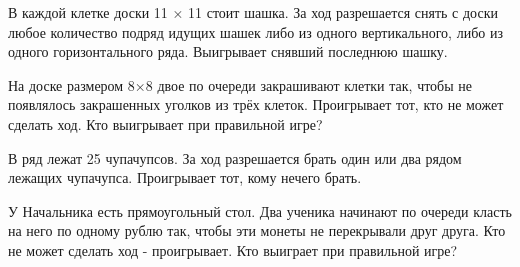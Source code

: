 В каждой клетке доски 11 × 11 стоит шашка. За ход разрешается снять с доски любое количество подряд идущих шашек либо из одного вертикального, либо из одного горизонтального ряда. Выигрывает снявший последнюю шашку.  

На доске размером 8×8 двое по очереди закрашивают клетки так, чтобы не появлялось закрашенных уголков из трёх клеток. Проигрывает тот, кто не может сделать ход. Кто выигрывает при правильной игре?

 В ряд лежат 25 чупачупсов. За ход разрешается брать один или два рядом лежащих чупачупса. Проигрывает тот, кому нечего брать.

 У Начальника есть прямоугольный стол. Два ученика начинают по очереди класть на него по одному рублю так, чтобы эти монеты не перекрывали друг друга. Кто не может сделать ход - проигрывает. Кто выиграет при правильной игре?